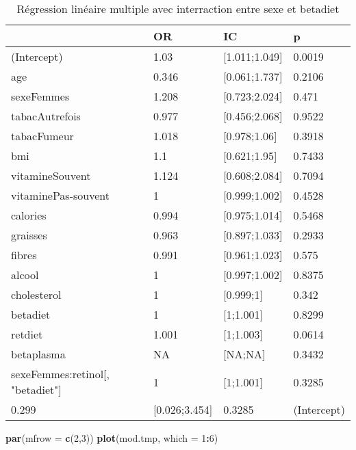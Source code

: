 \documentclass[]{article}
\newenvironment{Shaded}{\begin{snugshade}}{\end{snugshade}}
\newcommand{\KeywordTok}[1]{\textcolor[rgb]{0.13,0.29,0.53}{\textbf{#1}}}
\newcommand{\DataTypeTok}[1]{\textcolor[rgb]{0.13,0.29,0.53}{#1}}
\newcommand{\DecValTok}[1]{\textcolor[rgb]{0.00,0.00,0.81}{#1}}
\newcommand{\OperatorTok}[1]{\textcolor[rgb]{0.81,0.36,0.00}{\textbf{#1}}}
\newcommand{\NormalTok}[1]{#1}
\begin{document}
\begin{table}

\caption{\label{tab:unnamed-chunk-84}Régression linéaire multiple avec interraction entre sexe et betadiet}
\centering
\begin{tabular}[t]{l|l|l|l}
\hline
  & OR & IC & p\\
\hline
\rowcolor[HTML]{BBD2E1}  (Intercept) & 1.03 & [1.011;1.049] & 0.0019\\
\hline
age & 0.346 & [0.061;1.737] & 0.2106\\
\hline
\rowcolor[HTML]{BBD2E1}  sexeFemmes & 1.208 & [0.723;2.024] & 0.471\\
\hline
tabacAutrefois & 0.977 & [0.456;2.068] & 0.9522\\
\hline
\rowcolor[HTML]{BBD2E1}  tabacFumeur & 1.018 & [0.978;1.06] & 0.3918\\
\hline
bmi & 1.1 & [0.621;1.95] & 0.7433\\
\hline
\rowcolor[HTML]{BBD2E1}  vitamineSouvent & 1.124 & [0.608;2.084] & 0.7094\\
\hline
vitaminePas-souvent & 1 & [0.999;1.002] & 0.4528\\
\hline
\rowcolor[HTML]{BBD2E1}  calories & 0.994 & [0.975;1.014] & 0.5468\\
\hline
graisses & 0.963 & [0.897;1.033] & 0.2933\\
\hline
\rowcolor[HTML]{BBD2E1}  fibres & 0.991 & [0.961;1.023] & 0.575\\
\hline
alcool & 1 & [0.997;1.002] & 0.8375\\
\hline
\rowcolor[HTML]{BBD2E1}  cholesterol & 1 & [0.999;1] & 0.342\\
\hline
betadiet & 1 & [1;1.001] & 0.8299\\
\hline
\rowcolor[HTML]{BBD2E1}  retdiet & 1.001 & [1;1.003] & 0.0614\\
\hline
betaplasma & NA & [NA;NA] & 0.3432\\
\hline
\rowcolor[HTML]{BBD2E1}  sexeFemmes:retinol[, "betadiet"] & 1 & [1;1.001] & 0.3285\\
\hline
0.299 & [0.026;3.454] & 0.3285 & (Intercept)\\
\hline
\end{tabular}
\end{table}

\begin{Shaded}
\begin{Highlighting}[]
\KeywordTok{par}\NormalTok{(}\DataTypeTok{mfrow =} \KeywordTok{c}\NormalTok{(}\DecValTok{2}\NormalTok{,}\DecValTok{3}\NormalTok{))}
\KeywordTok{plot}\NormalTok{(mod.tmp, }\DataTypeTok{which =} \DecValTok{1}\OperatorTok{:}\DecValTok{6}\NormalTok{)}
\end{Highlighting}
\end{Shaded}
\end{document}
